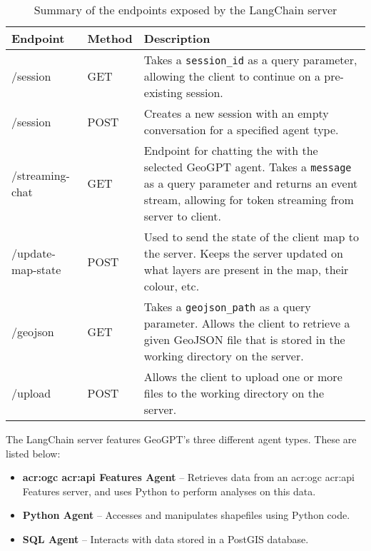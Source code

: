 \begin{table}[H]
    \centering
    \caption[API endpoints exposed by GeoGPT's LangChain server]{Summary of the endpoints exposed by the LangChain server}
    \label{tbl:server-endpoints}
    \begin{tabular}{p{}p{}p{}}
        \toprule
        \textbf{Endpoint} & \textbf{Method} & \textbf{Description}                                                                                                                                                                     \\
        \midrule
        /session          & GET             & Takes a \texttt{session\_id} as a query parameter, allowing the client to continue on a pre-existing session.                                                                            \\
        /session          & POST            & Creates a new session with an empty conversation for a specified agent type.                                                                                                             \\
        /streaming-chat   & GET             & Endpoint for chatting the with the selected GeoGPT agent. Takes a \texttt{message} as a query parameter and returns an event stream, allowing for token streaming from server to client. \\
        /update-map-state & POST            & Used to send the state of the client map to the server. Keeps the server updated on what layers are present in the map, their colour, etc.                                               \\
        /geojson          & GET             & Takes a \texttt{geojson\_path} as a query parameter. Allows the client to retrieve a given GeoJSON file that is stored in the working directory on the server.                           \\
        /upload           & POST            & Allows the client to upload one or more files to the working directory on the server.                                                                                                    \\
        \bottomrule
    \end{tabular}
\end{table}

The LangChain server features GeoGPT's three different agent types. These are listed below:

\begin{itemize}
    \item \textbf{\acrshort{acr:ogc} \acrshort{acr:api} Features Agent} -- Retrieves data from an \acrshort{acr:ogc} \acrshort{acr:api} Features server, and uses Python to perform analyses on this data.
    \item \textbf{Python Agent} -- Accesses and manipulates shapefiles using Python code.
    \item \textbf{SQL Agent} -- Interacts with data stored in a PostGIS database.
\end{itemize}

